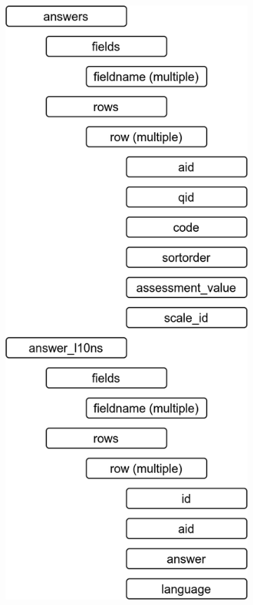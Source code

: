 \begin{figure}[h]
	\centering
	\begin{subfigure}[b]{.45\textwidth}
		\includegraphics[width=.95\textwidth]{./img/append_lss_ans.png}

\end{subfigure}
\end{figure}
